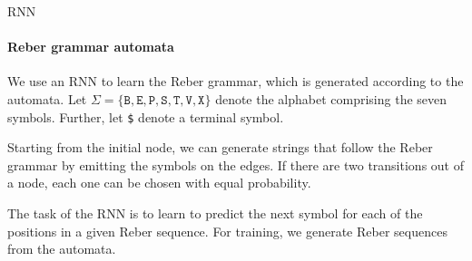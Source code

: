 %
%
%
%
\begin{frame}{RNN}
\framesubtitle{Reber grammar automata}
    We use an RNN to learn the Reber grammar, which is generated
    according to the automata.%
Let
    $\Sigma = \{\texttt{B}, \texttt{E}, \texttt{P}, \texttt{S},
    \texttt{T}, \texttt{V}, \texttt{X}\}$ denote the alphabet comprising
    the seven symbols. Further, let \texttt{\$} denote a terminal symbol.

\medskip

    Starting from the initial node, we can generate strings that follow
    the Reber grammar by emitting the symbols on the edges. If there are
    two transitions out of a node, each one can be chosen with equal
    probability. 

\medskip

    The task of the RNN is to learn to predict the next symbol for each
    of the positions in a given Reber sequence. For training, we
    generate Reber sequences from the automata.

\end{frame}


